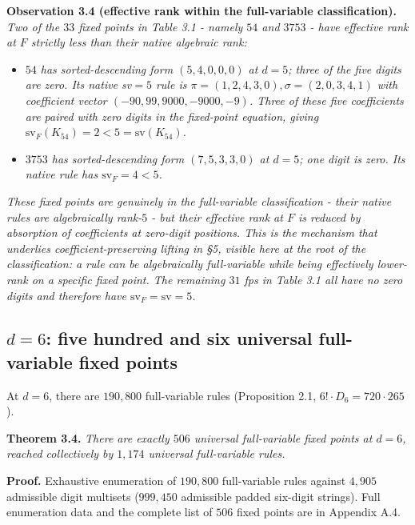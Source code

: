 \documentclass[11pt,letterpaper]{article}
\theoremstyle{paperstyle}
\theoremstyle{paperstyledef}
\theoremstyle{paperstylerem}
\begin{document}
\textbf{Observation 3.4 (effective rank within the full-variable
classification).} \emph{Two of the \(33\) fixed points in Table 3.1 -
namely \(54\) and \(3753\) - have effective rank at \(F\) strictly
less than their native algebraic rank:}

\begin{itemize}
\item
  \emph{\(54\) has sorted-descending form \((5, 4, 0, 0, 0)\) at
  \(d = 5\); three of the five digits are zero. Its native sv\(=5\) rule
  is \(\pi = (1, 2, 4, 3, 0), \sigma = (2, 0, 3, 4, 1)\) with
  coefficient vector \((-90, 99, 9000, -9000, -9)\). Three of these five
  coefficients are paired with zero digits in the fixed-point equation,
  giving \(\mathrm{sv}_F(K_{54}) = 2 < 5 = \mathrm{sv}(K_{54})\).}
\item
  \emph{\(3753\) has sorted-descending form \((7, 5, 3, 3, 0)\) at
  \(d = 5\); one digit is zero. Its native rule has
  \(\mathrm{sv}_F = 4 < 5\).}
\end{itemize}

\emph{These fixed points are genuinely in the full-variable
classification - their native rules are algebraically rank-\(5\) -
but their effective rank at \(F\) is reduced by absorption of
coefficients at zero-digit positions. This is the mechanism that
underlies coefficient-preserving lifting in §5, visible here at the root
of the classification: a rule can be algebraically full-variable while
being effectively lower-rank on a specific fixed point. The remaining
\(31\) fps in Table 3.1 all have no zero digits and therefore have
\(\mathrm{sv}_F = \mathrm{sv} = 5\).}

\hypertarget{d-6-five-hundred-and-six-universal-full-variable-fixed-points}{%
\subsection{\texorpdfstring{\(d = 6\): five hundred and six universal full-variable fixed points}{d = 6: five hundred and six universal full-variable fixed points}}\label{d-6-five-hundred-and-six-universal-full-variable-fixed-points}}

At \(d = 6\), there are \(190{,}800\) full-variable rules (Proposition
2.1, \(6! \cdot D_6 = 720 \cdot 265\)).

\textbf{Theorem 3.4.} \emph{There are exactly \(506\) universal
full-variable fixed points at \(d = 6\), reached collectively by
\(1{,}174\) universal full-variable rules.}

\textbf{Proof.} Exhaustive enumeration of \(190{,}800\) full-variable
rules against \(4{,}905\) admissible digit multisets (\(999{,}450\)
admissible padded six-digit strings). Full enumeration data and the
complete list of \(506\) fixed points are in Appendix A.4.
\end{document}
